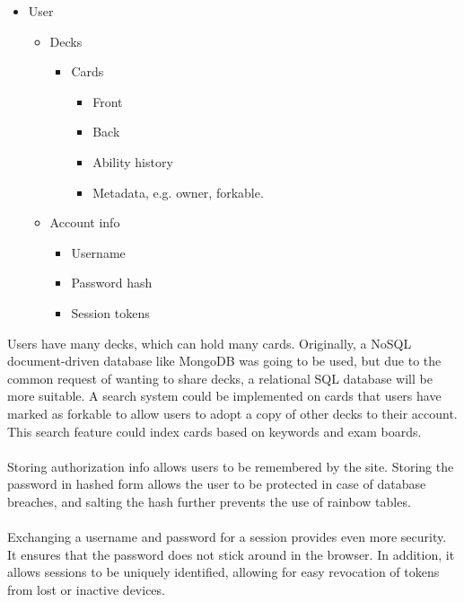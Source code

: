 \documentclass{report}
\begin{document}
\begin{itemize}
  \item User \begin{itemize}
    \item Decks \begin{itemize}
      \item Cards \begin{itemize}
        \item Front
        \item Back
        \item Ability history
        \item Metadata, e.g. owner, forkable.
      \end{itemize}
    \end{itemize}
    \item Account info \begin{itemize}
      \item Username
      \item Password hash
      \item Session tokens
    \end{itemize}
  \end{itemize}
\end{itemize}

Users have many decks, which can hold many cards. Originally, a NoSQL document-driven database like MongoDB was going to be used, but due to the common request of wanting to share decks, a relational SQL database will be more suitable. A search system could be implemented on cards that users have marked as forkable to allow users to adopt a copy of other decks to their account. This search feature could index cards based on keywords and exam boards.

\paragraph{}
Storing authorization info allows users to be remembered by the site. Storing the password in hashed form allows the user to be protected in case of database breaches, and salting the hash further prevents the use of rainbow tables.

\paragraph{}
Exchanging a username and password for a session provides even more security. It ensures that the password does not stick around in the browser. In addition, it allows sessions to be uniquely identified, allowing for easy revocation of tokens from lost or inactive devices.
\end{document}
